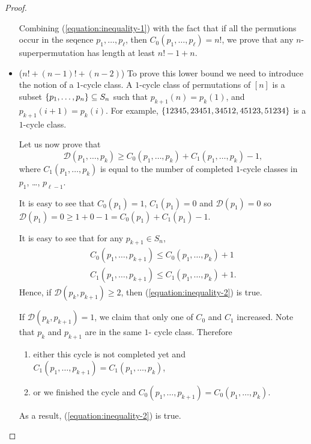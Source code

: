\begin{proof}
\begin{itemize}
      Combining (\ref{equation:inequality-1}) with the fact that if all the
      permutions occur in the seqence $p_1, \dots, p_\ell$, then
      $C_0(p_1, \dots, p_\ell) = n!$,
      we prove that any $n$-superpermutation has length at least $n! - 1 + n$.
    \item ($n! + (n - 1)! + (n - 2)$)
      To prove this lower bound we need to introduce the notion of a $1$-cycle
      class. A $1$-cycle class of permutations of $[n]$ is a
      subset $\set{p_1, \dots, p_n} \subseteq S_n$ such that $p_{k + 1}(n) =
      p_k(1)$, and $p_{k + 1}(i + 1) = p_k(i)$. For
      example, $\set{12345, 23451, 34512, 45123, 51234}$ is a $1$-cycle
      class.

      Let us now prove that
      \begin{equation}
        \label{equation:inequality-2}
        \mathcal{D}(p_1, \dots, p_k) \ge
        C_0(p_1, \dots, p_k) + C_1(p_1, \dots, p_k) - 1,
      \end{equation}
      where $C_1(p_1, \dots, p_k)$ is equal to the number of completed $1$-cycle
      classes in $p_1$, \dots, $p_{\ell - 1}$.

      It is easy to see that $C_0(p_1) = 1$, $C_1(p_1) = 0$ and
      $\mathcal{D}(p_1) = 0$ so
      $\mathcal{D}(p_1) = 0 \ge 1 + 0 - 1 = C_0(p_1) + C_1(p_1) - 1$.

      It is easy to see that for any $p_{k + 1} \in S_n$,
      \begin{gather*}
        C_0(p_1, \dots, p_{k + 1}) \le C_0(p_1, \dots, p_k) + 1  \\
        C_1(p_1, \dots, p_{k + 1}) \le C_1(p_1, \dots, p_k) + 1.
      \end{gather*}
      Hence, if $\mathcal{D}(p_k, p_{k + 1}) \ge 2$, then
      (\ref{equation:inequality-2}) is true.

      If $\mathcal{D}(p_k, p_{k + 1}) = 1$, we claim that only one of $C_0$ and
      $C_1$ increased. Note that $p_k$ and $p_{k + 1}$ are in the same $1$-
      cycle class. Therefore
      \begin{enumerate}
        \item either this cycle is not completed yet and
          $C_1(p_1, \dots, p_{k + 1}) = C_1(p_1, \dots, p_k)$,
        \item or we finished the cycle and
          $C_0(p_1, \dots, p_{k + 1}) = C_0(p_1, \dots, p_k)$.
      \end{enumerate}
      As a result, (\ref{equation:inequality-2}) is true.


\end{itemize}
\end{proof}
